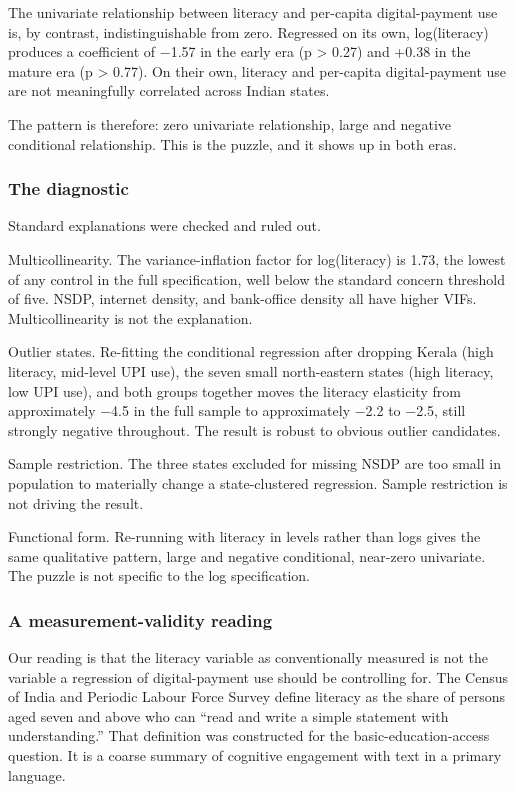 \documentclass[
]{article}
\begin{document}
The univariate relationship between literacy and per-capita
digital-payment use is, by contrast, indistinguishable from zero.
Regressed on its own, log(literacy) produces a coefficient of −1.57 in
the early era (p \textgreater{} 0.27) and +0.38 in the mature era (p
\textgreater{} 0.77). On their own, literacy and per-capita
digital-payment use are not meaningfully correlated across Indian
states.

The pattern is therefore: zero univariate relationship, large and
negative conditional relationship. This is the puzzle, and it shows up
in both eras.

\subsubsection{The diagnostic}\label{the-diagnostic}

Standard explanations were checked and ruled out.

Multicollinearity. The variance-inflation factor for log(literacy) is
1.73, the lowest of any control in the full specification, well below
the standard concern threshold of five. NSDP, internet density, and
bank-office density all have higher VIFs. Multicollinearity is not the
explanation.

Outlier states. Re-fitting the conditional regression after dropping
Kerala (high literacy, mid-level UPI use), the seven small north-eastern
states (high literacy, low UPI use), and both groups together moves the
literacy elasticity from approximately −4.5 in the full sample to
approximately −2.2 to −2.5, still strongly negative throughout. The
result is robust to obvious outlier candidates.

Sample restriction. The three states excluded for missing NSDP are too
small in population to materially change a state-clustered regression.
Sample restriction is not driving the result.

Functional form. Re-running with literacy in levels rather than logs
gives the same qualitative pattern, large and negative conditional,
near-zero univariate. The puzzle is not specific to the log
specification.

\subsubsection{A measurement-validity
reading}\label{a-measurement-validity-reading}

Our reading is that the literacy variable as conventionally measured is
not the variable a regression of digital-payment use should be
controlling for. The Census of India and Periodic Labour Force Survey
define literacy as the share of persons aged seven and above who can
``read and write a simple statement with understanding.'' That
definition was constructed for the basic-education-access question. It
is a coarse summary of cognitive engagement with text in a primary
language.
\end{document}
